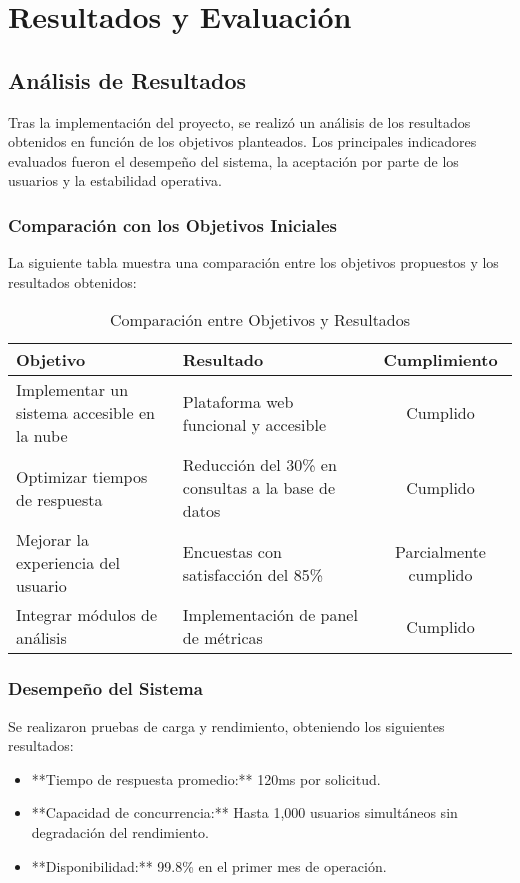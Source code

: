 \chapter{Resultados y Evaluación}

\section{Análisis de Resultados}

Tras la implementación del proyecto, se realizó un análisis de los resultados obtenidos en función de los objetivos planteados. Los principales indicadores evaluados fueron el desempeño del sistema, la aceptación por parte de los usuarios y la estabilidad operativa.

\subsection{Comparación con los Objetivos Iniciales}
La siguiente tabla muestra una comparación entre los objetivos propuestos y los resultados obtenidos:

\begin{table}[h]
	\centering
	\begin{tabular}{|p{5cm}|p{5cm}|c|}
		\hline
		\textbf{Objetivo} & \textbf{Resultado} & \textbf{Cumplimiento} \\ \hline
		Implementar un sistema accesible en la nube & Plataforma web funcional y accesible & Cumplido \\ \hline
		Optimizar tiempos de respuesta & Reducción del 30\% en consultas a la base de datos & Cumplido \\ \hline
		Mejorar la experiencia del usuario & Encuestas con satisfacción del 85\% & Parcialmente cumplido \\ \hline
		Integrar módulos de análisis & Implementación de panel de métricas & Cumplido \\ \hline
	\end{tabular}
	\caption{Comparación entre Objetivos y Resultados}
\end{table}


\subsection{Desempeño del Sistema}
Se realizaron pruebas de carga y rendimiento, obteniendo los siguientes resultados:

\begin{itemize}
	\item **Tiempo de respuesta promedio:** 120ms por solicitud.
	\item **Capacidad de concurrencia:** Hasta 1,000 usuarios simultáneos sin degradación del rendimiento.
	\item **Disponibilidad:** 99.8\% en el primer mes de operación.
\end{itemize}



